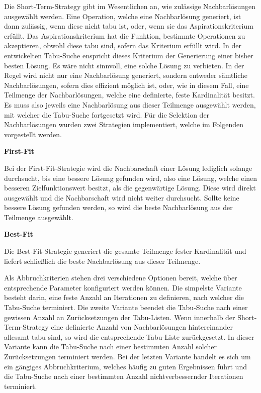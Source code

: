 Die Short-Term-Strategy gibt im Wesentlichen an, wie zulässige Nachbarlösungen ausgewählt werden.
Eine Operation, welche eine Nachbarlösung generiert, ist dann zulässig, wenn diese nicht tabu ist,
oder, wenn sie das Aspirationskriterium erfüllt. Das Aspirationskriterium hat die Funktion, bestimmte
Operationen zu akzeptieren, obwohl diese tabu sind, sofern das Kriterium erfüllt wird.
In der entwickelten Tabu-Suche enspricht dieses Kriterium der Generierung einer bisher besten Lösung.
Es wäre nicht sinnvoll, eine solche Lösung zu verbieten.\newline
In der Regel wird nicht nur eine Nachbarlösung generiert, sondern entweder sämtliche Nachbarlösungen,
sofern dies effizient möglich ist, oder, wie in diesem Fall, eine Teilmenge der Nachbarlösungen,
welche eine definierte, feste Kardinalität besitzt. Es muss also jeweils eine Nachbarlösung aus dieser
Teilmenge ausgewählt werden, mit welcher die Tabu-Suche fortgesetzt wird.
Für die Selektion der Nachbarlösungen wurden zwei Strategien implementiert, welche im Folgenden vorgestellt
werden.

\vfill
\pagebreak

\textbf{First-Fit}

Bei der First-Fit-Strategie wird die Nachbarschaft einer Lösung lediglich solange durchsucht, bis eine bessere
Lösung gefunden wird, also eine Lösung, welche einen besseren Zielfunktionswert besitzt, als die gegenwärtige Lösung.
Diese wird direkt ausgewählt und die Nachbarschaft wird nicht weiter durchsucht. Sollte keine bessere Lösung gefunden werden,
so wird die beste Nachbarlösung aus der Teilmenge ausgewählt.

\textbf{Best-Fit}

Die Best-Fit-Strategie generiert die gesamte Teilmenge fester Kardinalität und liefert schließlich die
beste Nachbarlösung aus dieser Teilmenge.\newline

Als Abbruchkriterien stehen drei verschiedene Optionen bereit, welche über entsprechende Parameter konfiguriert werden können.
Die simpelste Variante besteht darin, eine feste Anzahl an Iterationen zu definieren, nach welcher die Tabu-Suche terminiert.
Die zweite Variante beendet die Tabu-Suche nach einer gewissen Anzahl an Zurücksetzungen der Tabu-Listen. Wenn innerhalb
der Short-Term-Strategy eine definierte Anzahl von Nachbarlösungen hintereinander allesamt tabu sind, so wird die
entsprechende Tabu-Liste zurückgesetzt. In dieser Variante kann die Tabu-Suche nach einer bestimmten Anzahl solcher Zurücksetzungen terminiert werden. Bei der letzten Variante handelt es sich um ein gängiges Abbruchkriterium, welches häufig zu guten Ergebnissen führt und die Tabu-Suche nach einer bestimmten Anzahl nichtverbessernder Iterationen terminiert.

